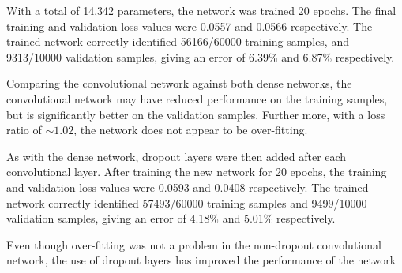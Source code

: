 With a total of 14,342 parameters, the network was trained 20 epochs.
The final training and validation loss values were 0.0557 and 0.0566
respectively.
The trained network correctly identified 56166/60000 training samples, and
9313/10000 validation samples, giving an error of 6.39\% and 6.87\%
respectively.

Comparing the convolutional network against both dense networks, the
convolutional network may have reduced performance on the training samples, but
is significantly better on the validation samples.
Further more, with a loss ratio of $\sim1.02$, the network does not appear to be
over-fitting.

As with the dense network, dropout layers were then added after each
convolutional layer.
After training the new network for 20 epochs, the training and validation loss
values were 0.0593 and 0.0408 respectively.
The trained network correctly identified 57493/60000 training samples and
9499/10000 validation samples, giving an error of 4.18\% and 5.01\%
respectively.

Even though over-fitting was not a problem in the non-dropout convolutional network, the use of dropout layers has improved the performance of the network





%



